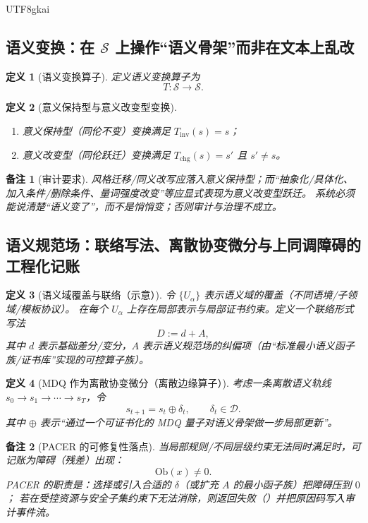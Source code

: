 \documentclass[12pt]{article}
\newtheorem{definition}{定义}[section]
\newtheorem{remark}{备注}[section]
\newcommand{\code}[1]{\path{#1}}
\begin{document}
\begin{CJK*}{UTF8}{gkai}
\subsection{语义变换：在 \texorpdfstring{$\mathcal{S}$}{S} 上操作“语义骨架”而非在文本上乱改}
\label{subsec:semantic-transform-on-quotient}

\begin{definition}[语义变换算子]
定义语义变换算子为
\[
T:\mathcal{S}\to \mathcal{S}.
\]
\end{definition}

\begin{definition}[意义保持型与意义改变型变换]
\begin{enumerate}
  \item 意义保持型（同伦不变）变换满足 $T_{\mathrm{inv}}(s)=s$；
  \item 意义改变型（同伦跃迁）变换满足 $T_{\mathrm{chg}}(s)=s'$ 且 $s'\neq s$。
\end{enumerate}
\end{definition}

\begin{remark}[审计要求]
风格迁移/同义改写应落入意义保持型；而“抽象化/具体化、加入条件/删除条件、量词强度改变”等应显式表现为意义改变型跃迁。
系统必须能说清楚“语义变了”，而不是悄悄变；否则审计与治理不成立。
\end{remark}

\subsection{语义规范场：联络写法、离散协变微分与上同调障碍的工程化记账}
\label{subsec:semantic-gauge-field-connection}

\begin{definition}[语义域覆盖与联络（示意）]
令 $\{U_\alpha\}$ 表示语义域的覆盖（不同语境/子领域/模板协议）。
在每个 $U_\alpha$ 上存在局部表示与局部证书约束。定义一个联络形式写法
\[
D:=d+A,
\]
其中 $d$ 表示基础差分/变分，$A$ 表示语义规范场的纠偏项（由“标准最小语义函子族/证书库”实现的可控算子族）。
\end{definition}

\begin{definition}[MDQ 作为离散协变微分（离散边缘算子）]
考虑一条离散语义轨线 $s_0\to s_1\to\cdots\to s_T$，令
\[
s_{t+1}=s_t\oplus \delta_t,
\qquad
\delta_t\in\mathcal{D}.
\]
其中 $\oplus$ 表示“通过一个可证书化的 MDQ 量子对语义骨架做一步局部更新”。
\end{definition}

\begin{remark}[PACER 的可修复性落点]
当局部规则/不同层级约束无法同时满足时，可记账为障碍（残差）出现：
\[
\mathrm{Ob}(x)\neq 0.
\]
PACER 的职责是：选择或引入合适的 $\delta$（或扩充 $A$ 的最小函子族）把障碍压到 $0$；
若在受控资源与安全子集约束下无法消除，则返回失败（\code{ok:false}）并把原因码写入审计事件流。
\end{remark}


\end{CJK*}
\end{document}
